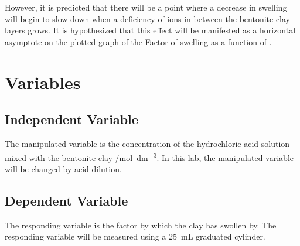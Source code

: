 \documentclass[11pt, letterpaper]{article}
\begin{document}
However, it is predicted that there will be a point where
a decrease in swelling will begin to slow down when a deficiency
of  ions in between the bentonite clay layers grows.
It is hypothesized that this effect will be manifested
as a horizontal asymptote on the plotted graph of the Factor
of swelling as a function of \ce{[H+]}.

\section{Variables}

\begin{paracol}{2}
    \subsection{Independent Variable}
    The manipulated variable is the concentration of the hydrochloric acid solution mixed with the
    bentonite clay /\unit{mol.dm^{-3}}. In this lab, the manipulated variable will be
    changed by acid dilution.
    \switchcolumn
    \subsection{Dependent Variable}
    The responding variable is the factor by which the clay has swollen by.
    The responding variable will be measured using a \SI{25}{mL} graduated cylinder.

\end{paracol}
\end{document}
